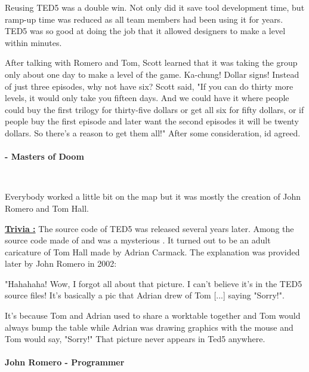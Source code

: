 \documentclass[book.tex]{subfiles}
\begin{document}
Reusing TED5 was a double win. Not only did it save tool development time, but ramp-up time was reduced as all team members had been using it for years. TED5 was so good at doing the job that it allowed designers to make a level within minutes.\\
\par

 \begin{fancyquotes}
After talking with Romero and Tom, Scott learned that it was taking the group only about one day to make a level of the game. Ka-chung! Dollar signs! Instead of just three episodes, why not have six? Scott said, "If you can do thirty more levels, it would only take you fifteen days. And we could have it where people could buy the first trilogy for thirty-five dollars or get all six for fifty dollars, or if people buy the first episode and later want the second episodes it will be twenty dollars. So there's a reason to get them all!" After some consideration, id agreed.\\
\\
 \textbf{- Masters of Doom}
 \end{fancyquotes}\\

\par
Everybody worked a little bit on the map but it was mostly the creation of John Romero and Tom Hall.\\
\par
 \textbf{\underline{Trivia :}} The source code of TED5 was released several years later. Among the source code made of  and  was a mysterious . It turned out to be an adult caricature of Tom Hall made by Adrian Carmack. The explanation was provided later by John Romero in 2002:\\
\par
 \begin{fancyquotes}
   "Hahahaha! Wow, I forgot all about that picture. I can't believe it's 
in the TED5 source files! It's basically a pic that Adrian drew of Tom 
[...] saying "Sorry!".\\
\par 
It's because Tom and Adrian used to share a worktable together and Tom 
would always bump the table while Adrian was drawing graphics with the 
mouse and Tom would say, "Sorry!" That picture never appears in Ted5 
anywhere.\\
   \\
\textbf{John Romero - Programmer}
 \end{fancyquotes}\\
\end{document}
